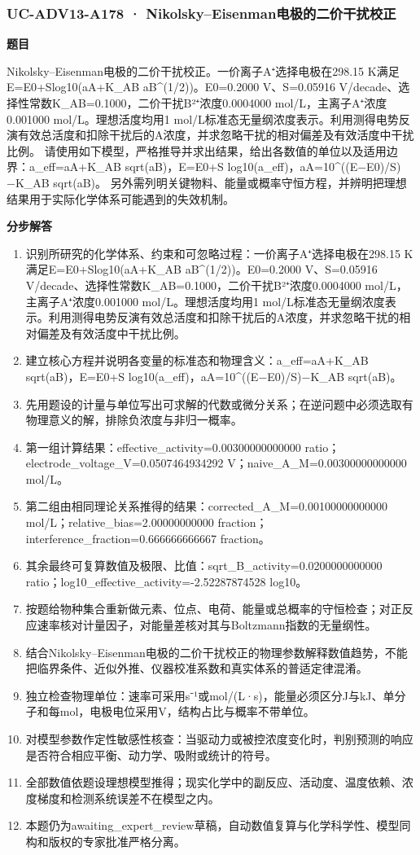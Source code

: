 \documentclass[UTF8,11pt,a4paper]{ctexart}
\begin{document}
\subsubsection*{UC-ADV13-A178 · Nikolsky–Eisenman电极的二价干扰校正}
\noindent\textbf{题目}\par
Nikolsky–Eisenman电极的二价干扰校正。一价离子A⁺选择电极在298.15 K满足E=E0+Slog10(aA+K\_AB aB\textasciicircum{}(1/2))。E0=0.2000 V、S=0.05916 V/decade、选择性常数K\_AB=0.1000，二价干扰B²⁺浓度0.0004000 mol/L，主离子A⁺浓度0.001000 mol/L。理想活度均用1 mol/L标准态无量纲浓度表示。利用测得电势反演有效总活度和扣除干扰后的A浓度，并求忽略干扰的相对偏差及有效活度中干扰比例。 请使用如下模型，严格推导并求出结果，给出各数值的单位以及适用边界：a\_eff=aA+K\_AB sqrt(aB)，E=E0+S log10(a\_eff)，aA=10\textasciicircum{}((E−E0)/S)−K\_AB sqrt(aB)。 另外需列明关键物料、能量或概率守恒方程，并辨明把理想结果用于实际化学体系可能遇到的失效机制。\par
\medskip\noindent\textbf{分步解答}
\begin{enumerate}
\item 识别所研究的化学体系、约束和可忽略过程：一价离子A⁺选择电极在298.15 K满足E=E0+Slog10(aA+K\_AB aB\textasciicircum{}(1/2))。E0=0.2000 V、S=0.05916 V/decade、选择性常数K\_AB=0.1000，二价干扰B²⁺浓度0.0004000 mol/L，主离子A⁺浓度0.001000 mol/L。理想活度均用1 mol/L标准态无量纲浓度表示。利用测得电势反演有效总活度和扣除干扰后的A浓度，并求忽略干扰的相对偏差及有效活度中干扰比例。
\item 建立核心方程并说明各变量的标准态和物理含义：a\_eff=aA+K\_AB sqrt(aB)，E=E0+S log10(a\_eff)，aA=10\textasciicircum{}((E−E0)/S)−K\_AB sqrt(aB)。
\item 先用题设的计量与单位写出可求解的代数或微分关系；在逆问题中必须选取有物理意义的解，排除负浓度与非归一概率。
\item 第一组计算结果：effective\_activity=0.00300000000000 ratio；electrode\_voltage\_V=0.0507464934292 V；naive\_A\_M=0.00300000000000 mol/L。
\item 第二组由相同理论关系推得的结果：corrected\_A\_M=0.00100000000000 mol/L；relative\_bias=2.00000000000 fraction；interference\_fraction=0.666666666667 fraction。
\item 其余最终可复算数值及极限、比值：sqrt\_B\_activity=0.0200000000000 ratio；log10\_effective\_activity=-2.52287874528 log10。
\item 按题给物种集合重新做元素、位点、电荷、能量或总概率的守恒检查；对正反应速率核对计量因子，对能量差核对其与Boltzmann指数的无量纲性。
\item 结合Nikolsky–Eisenman电极的二价干扰校正的物理参数解释数值趋势，不能把临界条件、近似外推、仪器校准系数和真实体系的普适定律混淆。
\item 独立检查物理单位：速率可采用s⁻¹或mol/(L·s)，能量必须区分J与kJ、单分子和每mol，电极电位采用V，结构占比与概率不带单位。
\item 对模型参数作定性敏感性核查：当驱动力或被控浓度变化时，判别预测的响应是否符合相应平衡、动力学、吸附或统计的符号。
\item 全部数值依题设理想模型推得；现实化学中的副反应、活动度、温度依赖、浓度梯度和检测系统误差不在模型之内。
\item 本题仍为awaiting\_expert\_review草稿，自动数值复算与化学科学性、模型同构和版权的专家批准严格分离。
\end{enumerate}
\end{document}
